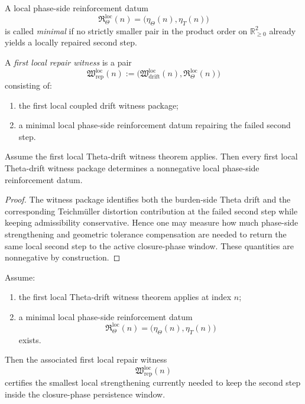 \begin{definition}
\label{def:minimal-local-phase-side-reinforcement}
A local phase-side reinforcement datum
\[
\mathfrak{R}_{\Theta}^{\mathrm{loc}}(n)
=
\bigl(
\eta_{\Theta}(n),
\eta_{T}(n)
\bigr)
\]
is called \emph{minimal} if no strictly smaller pair in the product order on $\mathbb{R}_{\ge 0}^{2}$ already yields a locally repaired second step.
\end{definition}

\begin{definition}
\label{def:first-local-repair-witness}
A \emph{first local repair witness} is a pair
\[
\mathfrak{W}_{\mathrm{rep}}^{\mathrm{loc}}(n)
:=
\bigl(
\mathfrak{W}_{\mathrm{drift}}^{\mathrm{loc}}(n),
\mathfrak{R}_{\Theta}^{\mathrm{loc}}(n)
\bigr)
\]
consisting of:
\begin{enumerate}
    \item the first local coupled drift witness package;
    \item a minimal local phase-side reinforcement datum repairing the failed second step.
\end{enumerate}
\end{definition}

\begin{proposition}
\label{prop:theta-drift-witnesses-induce-local-repair-data}
Assume the first local Theta-drift witness theorem applies.
Then every first local Theta-drift witness package determines a nonnegative local phase-side reinforcement datum.
\end{proposition}

\begin{proof}
The witness package identifies both the burden-side Theta drift and the corresponding Teichm\"uller distortion contribution at the failed second step while keeping admissibility conservative.
Hence one may measure how much phase-side strengthening and geometric tolerance compensation are needed to return the same local second step to the active closure-phase window.
These quantities are nonnegative by construction.
\end{proof}

\begin{lemma}
\label{lem:first-local-repair-lemma}
Assume:
\begin{enumerate}
    \item the first local Theta-drift witness theorem applies at index $n$;
    \item a minimal local phase-side reinforcement datum
    \[
    \mathfrak{R}_{\Theta}^{\mathrm{loc}}(n)
    =
    \bigl(
    \eta_{\Theta}(n),
    \eta_{T}(n)
    \bigr)
    \]
    exists.
\end{enumerate}
Then the associated first local repair witness
\[
\mathfrak{W}_{\mathrm{rep}}^{\mathrm{loc}}(n)
\]
certifies the smallest local strengthening currently needed to keep the second step inside the closure-phase persistence window.
\end{lemma}

